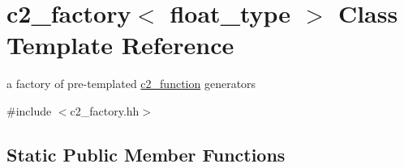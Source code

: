 \hypertarget{classc2__factory}{\section{c2\-\_\-factory$<$ float\-\_\-type $>$ Class Template Reference}
\label{classc2__factory}
}


a factory of pre-\/templated \hyperlink{classc2__function}{c2\-\_\-function} generators  




{\ttfamily \#include $<$c2\-\_\-factory.\-hh$>$}

\subsection*{Static Public Member Functions}
